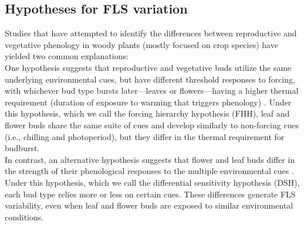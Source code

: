 \documentclass[11pt]{article}\usepackage[]{graphicx}\usepackage[]{color}
\begin{document}
\subsection*{Hypotheses for FLS variation}

\noindent Studies that have attempted to identify the differences between reproductive and vegetative phenology in woody plants (mostly focused on crop species) have yielded two common explanations:\\

\noindent One hypothesis suggests that reproductive and vegetative buds utilize the same underlying environmental cues, but have different threshold responses to forcing, with whichever bud type bursts later---leaves or flowers---having a higher thermal requirement (duration of exposure to warming that triggers phenology) \citep{Guo2014,COSMULESCU:2020aa,Cosmulescu:2018aa}. Under this hypothesis, which we call the forcing hierarchy hypothesis (FHH), leaf and flower buds share the same suite of cues and develop similarly to non-forcing cues (i.e., chilling and photoperiod), but they differ in the thermal requirement for budburst.\\

\noindent In contrast, an alternative hypothesis suggests that flower and leaf buds differ in the strength of their phenological responses to the multiple environmental cues \citep{Citadin2001,Gariglio2006,Aslani2009,Mehlenbacher:1991aa}. Under this hypothesis, which we call the differential sensitivity hypothesis (DSH), each bud type relies more or less on certain cues. These differences generate FLS variability, even when leaf and flower buds are exposed to similar environmental conditions.\\ %
\end{document}
